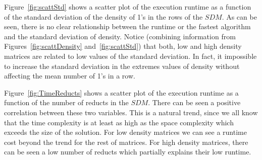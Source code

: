 \documentclass[authoryear,11pt]{elsarticle}
\begin{document}
	Figure~\ref{fig:scattStd} shows a scatter plot of the execution runtime as a function of 
	the standard deviation of the density of 1's in the rows of the $SDM$. As can be seen, there is no
	clear relationship between the runtime or the fastest algorithm and the standard deviation of density.
	Notice (combining information from Figures~\ref{fig:scattDensity} and~\ref{fig:scattStd}) that both, 
	low and high density matrices are related to low values of the standard deviation. In fact, it impossible
	to increase the standard deviation in the extremes values of density without affecting the mean
	number of 1's in a row.
	
	Figure~\ref{fig:TimeReducts} shows a scatter plot of the execution runtime as a function of the 
	number of reducts in the $SDM$. There can be seen a positive correlation between these two variables.
	This is a natural trend, since we all know that the time complexity is at least as high as the space 
	complexity which exceeds the size of the solution. For low density matrices we can see a runtime cost
	beyond the trend for the rest of matrices. For high density matrices, there can be seen a low number
	of reducts which partially explains their low runtime. 
	
\end{document}
